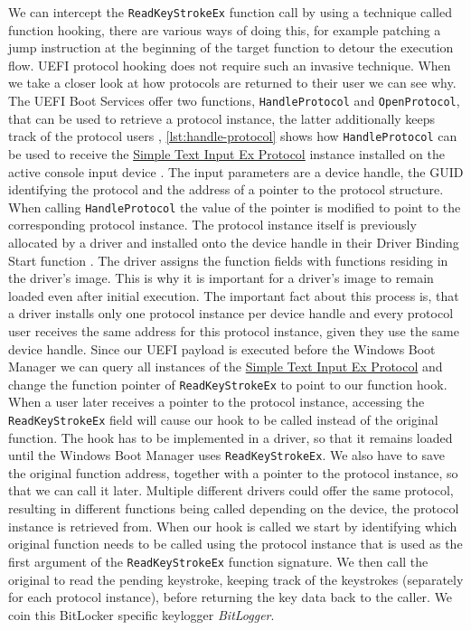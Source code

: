 We can intercept the \lstinline{ReadKeyStrokeEx} function call by using a technique called function hooking, there are various ways of doing this, for example patching a jump instruction at the beginning of the target function to detour the execution flow.
 \ac{UEFI} protocol hooking does not require such an invasive technique.
When we take a closer look at how protocols are returned to their user we can see why.
The \ac{UEFI} Boot Services offer two functions, \lstinline{HandleProtocol} and \lstinline{OpenProtocol}, that can be used to retrieve a protocol instance, the latter additionally keeps track of the protocol users \cite[7.3. OpenProtocol]{uefi-spec}, \autoref{lst:handle-protocol} shows how \lstinline{HandleProtocol} can be used to receive the \hyperref[lst:simple-text-input-ex-protocol]{Simple Text Input Ex Protocol} instance installed on the active console input device \cite[4.3. EFI System Table]{uefi-spec}.
The input parameters are a device handle, the \ac{GUID} identifying the protocol and the address of a pointer to the protocol structure.
When calling \lstinline{HandleProtocol} the value of the pointer is modified to point to the corresponding protocol instance.
The protocol instance itself is previously allocated by a driver and installed onto the device handle in their Driver Binding Start function .
The driver assigns the function fields with functions residing in the driver's image.
This is why it is important for a driver's image to remain loaded even after initial execution.
The important fact about this process is, that a driver installs only one protocol instance per device handle and every protocol user receives the same address for this protocol instance, given they use the same device handle.
Since our \ac{UEFI} payload is executed before the Windows Boot Manager we can query all instances of the \hyperref[lst:simple-text-input-ex-protocol]{Simple Text Input Ex Protocol} and change the function pointer of \lstinline{ReadKeyStrokeEx} to point to our function hook.
When a user later receives a pointer to the protocol instance, accessing the \lstinline{ReadKeyStrokeEx} field will cause our hook to be called instead of the original function.
The hook has to be implemented in a driver, so that it remains loaded until the Windows Boot Manager uses \lstinline{ReadKeyStrokeEx}.
We also have to save the original function address, together with a pointer to the protocol instance, so that we can call it later.
Multiple different drivers could offer the same protocol, resulting in different functions being called depending on the device, the protocol instance is retrieved from.
When our hook is called we start by identifying which original function needs to be called using the protocol instance that is used as the first argument of the \lstinline{ReadKeyStrokeEx} function signature.
We then call the original to read the pending keystroke, keeping track of the keystrokes (separately for each protocol instance), before returning the key data back to the caller.
We coin this BitLocker specific keylogger \emph{BitLogger}.

